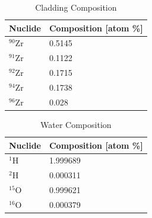     \begin{table}[<options>]
        \caption{Cladding Composition}
        \label{tab:clad-comp}
        \begin{tabular*}{\tblwidth}{@{}LL@{}}
            \toprule
            Nuclide & Composition [atom \%] \\ %
            \midrule
             $^{90}$Zr & 0.5145 \\
             $^{91}$Zr & 0.1122 \\
             $^{92}$Zr & 0.1715 \\
             $^{94}$Zr & 0.1738 \\
             $^{96}$Zr & 0.028 \\ 
             \bottomrule
        \end{tabular*}
    \end{table}

    \begin{table}[<options>]
        \caption{Water Composition}
        \label{tab:water-comp}
        \begin{tabular*}{\tblwidth}{@{}LL@{}}
            \toprule
            Nuclide & Composition [atom \%] \\ %
            \midrule
             $^{1}$H & 1.999689\\
             $^{2}$H & 0.000311 \\
             $^{15}$O & 0.999621 \\
             $^{16}$O & 0.000379 \\
             \bottomrule
        \end{tabular*}
    \end{table}

